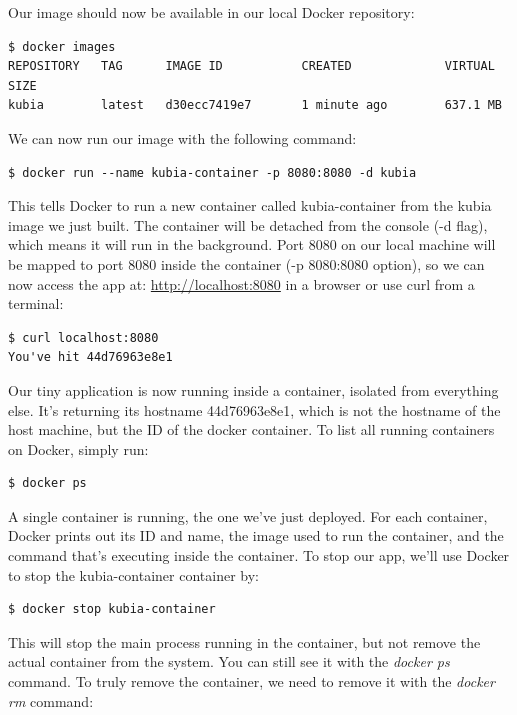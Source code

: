 \documentclass[a4paper,10pt]{article}
\begin{document}
Our image should now be available in our local Docker repository:

\begin{lstlisting}[numbers=none, basicstyle=\mdseries]
$ docker images
REPOSITORY   TAG      IMAGE ID           CREATED             VIRTUAL SIZE
kubia        latest   d30ecc7419e7       1 minute ago        637.1 MB
\end{lstlisting}

We can now run our image with the following command:

\begin{lstlisting}[numbers=none, basicstyle=\mdseries]
$ docker run --name kubia-container -p 8080:8080 -d kubia
\end{lstlisting}

This tells Docker to run a new container called kubia-container from the kubia image we just built. The container will be detached from the console (-d flag), which means it will run in the background. Port 8080 on our local machine will be mapped to port 8080 inside the container (-p 8080:8080 option), so we can now access the app at: \url{http://localhost:8080} in a browser or use curl from a terminal:

\begin{lstlisting}[numbers=none, basicstyle=\mdseries]
$ curl localhost:8080
You've hit 44d76963e8e1
\end{lstlisting}

Our tiny application is now running inside a container, isolated from everything else. It's returning its hostname 44d76963e8e1, which is not the hostname of the host machine, but the ID of the docker container. To list all running containers on Docker, simply run:

\begin{lstlisting}[numbers=none, basicstyle=\mdseries]
$ docker ps
\end{lstlisting}

A single container is running, the one we've just deployed. For each container, Docker prints out its ID and name, the image used to run the container, and the command that's executing inside the container. To stop our app, we'll use Docker to stop the kubia-container container by:

\begin{lstlisting}[numbers=none, basicstyle=\mdseries]
$ docker stop kubia-container
\end{lstlisting}

This will stop the main process running in the container, but not remove the actual container from the system. You can still see it with the\textit{ docker ps} command. To truly remove the container, we need to remove it with the \textit{docker rm} command:
\end{document}
